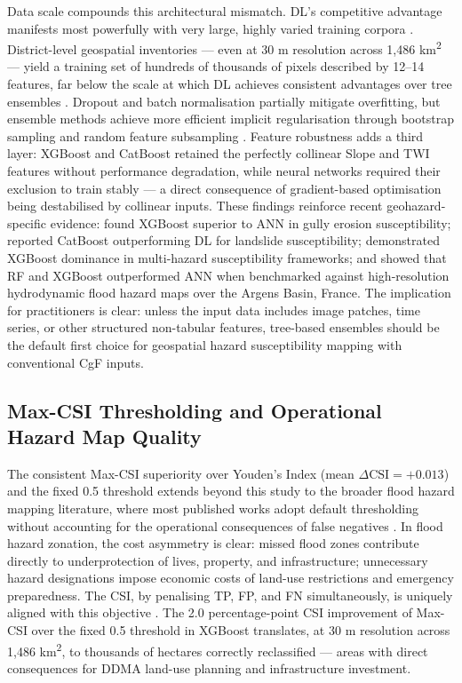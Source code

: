 \documentclass[12pt, a4paper]{article}
\begin{document}
Data scale compounds this architectural mismatch. DL's competitive advantage manifests most powerfully with very large, highly varied training corpora \citep{lecun2015, Vaswani2017}. District-level geospatial inventories --- even at 30 m resolution across 1,486 km\textsuperscript{2} --- yield a training set of hundreds of thousands of pixels described by 12--14 features, far below the scale at which DL achieves consistent advantages over tree ensembles \citep{shwartzziv2022}. Dropout and batch normalisation partially mitigate overfitting, but ensemble methods achieve more efficient implicit regularisation through bootstrap sampling and random feature subsampling \citep{dietterich2000, breiman2001}. Feature robustness adds a third layer: XGBoost and CatBoost retained the perfectly collinear Slope and TWI features without performance degradation, while neural networks required their exclusion to train stably --- a direct consequence of gradient-based optimisation being destabilised by collinear inputs. These findings reinforce recent geohazard-specific evidence: \citet{Arabameri2021} found XGBoost superior to ANN in gully erosion susceptibility; \citet{Iban2022} reported CatBoost outperforming DL for landslide susceptibility; \citet{zhang2022} demonstrated XGBoost dominance in multi-hazard susceptibility frameworks; and \citet{Arora2024Argens} showed that RF and XGBoost outperformed ANN when benchmarked against high-resolution hydrodynamic flood hazard maps over the Argens Basin, France. The implication for practitioners is clear: unless the input data includes image patches, time series, or other structured non-tabular features, tree-based ensembles should be the default first choice for geospatial hazard susceptibility mapping with conventional CgF inputs.

\subsection{Max-CSI Thresholding and Operational Hazard Map Quality}

The consistent Max-CSI superiority over Youden's Index (mean $\Delta\text{CSI} = +0.013$) and the fixed 0.5 threshold extends beyond this study to the broader flood hazard mapping literature, where most published works adopt default thresholding without accounting for the operational consequences of false negatives \citep{tehrany2019, Costache2020, Arora2022SERRA}. In flood hazard zonation, the cost asymmetry is clear: missed flood zones contribute directly to underprotection of lives, property, and infrastructure; unnecessary hazard designations impose economic costs of land-use restrictions and emergency preparedness. The CSI, by penalising TP, FP, and FN simultaneously, is uniquely aligned with this objective \citep{schaefer1990, mason2003}. The 2.0 percentage-point CSI improvement of Max-CSI over the fixed 0.5 threshold in XGBoost translates, at 30 m resolution across 1,486 km\textsuperscript{2}, to thousands of hectares correctly reclassified --- areas with direct consequences for DDMA land-use planning and infrastructure investment.
\end{document}
